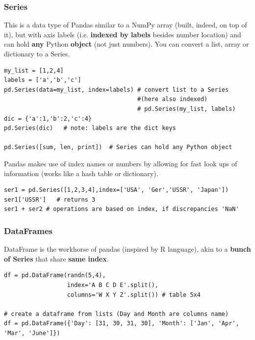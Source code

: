 \documentclass[11pt]{article}
\begin{document}
\subsubsection{Series}
This is a data type of Pandas similar to a NumPy array (built, indeed, on top of it), but with axis labels (i.e. \textbf{indexed by labels} besides number location) and can hold \textbf{any} Python \textbf{object} (not just numbers).
You can convert a list, array or dictionary to a Series. 
\begin{lstlisting}
my_list = [1,2,4]
labels = ['a','b','c']
pd.Series(data=my_list, index=labels) # convert list to a Series 
                                      #(here also indexed)
                                      # pd.Series(my_list, labels)   
dic = {'a':1,'b':2,'c':4}
pd.Series(dic)   # note: labels are the dict keys

pd.Series([sum, len, print])  # Series can hold any Python object
\end{lstlisting}

Pandas makes use of index names or numbers by allowing for fast look ups of information (works like a hash table or dictionary).
\begin{lstlisting}
ser1 = pd.Series([1,2,3,4],index=['USA', 'Ger','USSR', 'Japan'])     
ser1['USSR']   # returns 3
ser1 + ser2 # operations are based on index, if discrepancies 'NaN'
\end{lstlisting}

\subsubsection{DataFrames}
DataFrame is the workhorse of pandas (inspired by R language), akin to a \textbf{bunch of Series} that share \textbf{same index}.
\begin{lstlisting}
df = pd.DataFrame(randn(5,4), 
                  index='A B C D E'.split(), 
                  columns='W X Y Z'.split()) # table 5x4
                  
# create a dataframe from lists (Day and Month are columns name)
df = pd.DataFrame({'Day': [31, 30, 31, 30], 'Month': ['Jan', 'Apr', 'Mar', 'June']})
\end{lstlisting}
\end{document}
